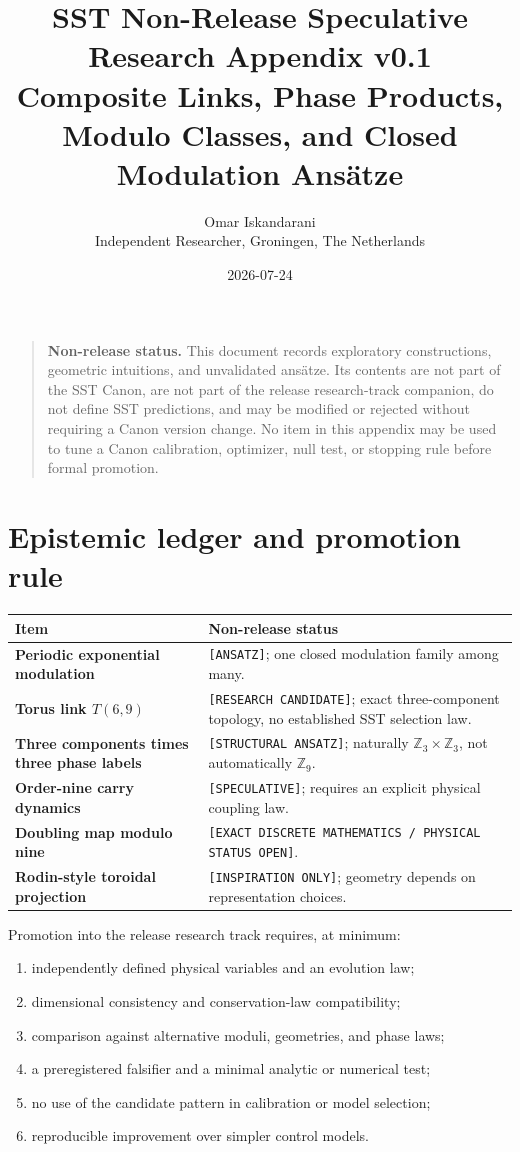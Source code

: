 \documentclass[11pt]{article}
\title{SST Non-Release Speculative Research Appendix v0.1\\
\large Composite Links, Phase Products, Modulo Classes, and Closed Modulation Ans\"atze}
\author{Omar Iskandarani\\Independent Researcher, Groningen, The Netherlands}
\date{2026-07-24}
\newcommand{\Z}{\mathbb Z}
\begin{document}
\maketitle

\begin{quote}
\textbf{Non-release status.}
This document records exploratory constructions, geometric intuitions, and
unvalidated ans\"atze.  Its contents are not part of the SST Canon, are not part
of the release research-track companion, do not define SST predictions, and
may be modified or rejected without requiring a Canon version change.  No item
in this appendix may be used to tune a Canon calibration, optimizer, null test,
or stopping rule before formal promotion.
\end{quote}

\section{Epistemic ledger and promotion rule}

\begin{center}
\begin{tabularx}{0.96\textwidth}{@{}>{\bfseries}p{}X@{}}
\toprule
Item & Non-release status \\
\midrule
Periodic exponential modulation & \texttt{[ANSATZ]}; one closed modulation family among many. \\
Torus link $T(6,9)$ & \texttt{[RESEARCH CANDIDATE]}; exact three-component topology, no established SST selection law. \\
Three components times three phase labels & \texttt{[STRUCTURAL ANSATZ]}; naturally $\Z_3\times\Z_3$, not automatically $\Z_9$. \\
Order-nine carry dynamics & \texttt{[SPECULATIVE]}; requires an explicit physical coupling law. \\
Doubling map modulo nine & \texttt{[EXACT DISCRETE MATHEMATICS / PHYSICAL STATUS OPEN]}. \\
Rodin-style toroidal projection & \texttt{[INSPIRATION ONLY]}; geometry depends on representation choices. \\
\bottomrule
\end{tabularx}
\end{center}

Promotion into the release research track requires, at minimum:
\begin{enumerate}
    \item independently defined physical variables and an evolution law;
    \item dimensional consistency and conservation-law compatibility;
    \item comparison against alternative moduli, geometries, and phase laws;
    \item a preregistered falsifier and a minimal analytic or numerical test;
    \item no use of the candidate pattern in calibration or model selection;
    \item reproducible improvement over simpler control models.
\end{enumerate}
\end{document}
